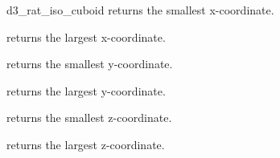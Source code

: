 \begin{ccRefClass}{d3_rat_iso_cuboid}
{returns the smallest x-coordinate.}
  
{returns the largest x-coordinate.}  
  
{returns the smallest y-coordinate.} 
  
{returns the largest y-coordinate.} 
  
{returns the smallest z-coordinate.}  
  
{returns the largest z-coordinate.}


\end{ccRefClass} 
